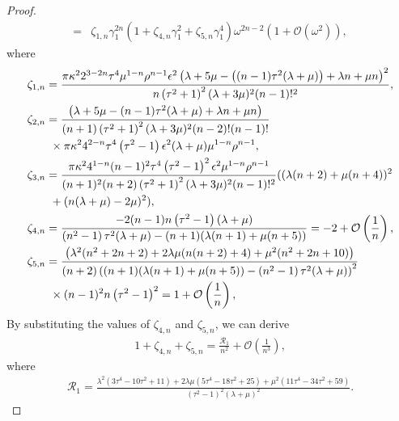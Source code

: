 \documentclass[10pt,a4paper]{amsart}
\begin{document}
\begin{proof}
\begin{align}
		=&\zeta _{1,n}\gamma_1 ^{2n}\left(1+\zeta _{4,n} \gamma_1 ^{2}+\zeta _{5,n} \gamma_1 ^{4}\right)\omega ^{2n-2}\left(1+\mathcal{O}(\omega^{2})\right),\label{eq:unorm}
	\end{align}
	where
	\begin{align}
		&\zeta _{1,n}=\frac{\pi  \kappa^2 2^{3-2 n} \tau ^4 \mu ^{1-n} \rho ^{n-1} \epsilon^{2}\left(\lambda +5 \mu -\left((n-1) \tau ^2 (\lambda +\mu )\right)+\lambda  n+\mu  n\right)^2}{n \left(\tau ^2+1\right)^2 (\lambda +3 \mu )^2  (n-1)!^2},\label{eq:zetau}\\
		&\zeta_{2,n}=\frac{\left(\lambda +5 \mu -(n-1) \tau ^2 (\lambda +\mu )+\lambda  n+\mu  n\right)}{(n+1) \left(\tau ^2+1\right)^2 (\lambda +3 \mu )^2(n-2)!(n-1)!}\notag\\
		&\quad\quad\times \pi  \kappa^2 4^{2-n} \tau ^4 \left(\tau ^2-1\right) \epsilon ^2 (\lambda +\mu ) \mu ^{1-n} \rho ^{n-1},\notag\\
		&\zeta_{3,n}=\frac{\pi  \kappa^2 4^{1-n} (n-1)^2 \tau ^4 \left(\tau ^2-1\right)^2 \epsilon ^2 \mu ^{1-n} \rho ^{n-1} }{(n+1)^2 (n+2) \left(\tau ^2+1\right)^2 (\lambda +3 \mu )^2  (n-1)!^2}((\lambda  (n+2)+\mu  (n+4))^2\notag\\
		&\quad\quad+(n (\lambda +\mu )-2 \mu )^2),\notag\\
		&\zeta _{4,n}=\frac{-2 (n-1) n \left(\tau ^2-1\right) (\lambda +\mu )}{\left(n^2-1\right) \tau ^2 (\lambda +\mu )-(n+1) (\lambda  (n+1)+\mu  (n+5))}=-2+\mathcal{O}\left(\frac{1}{n}\right),\notag\\
		&\zeta _{5,n}=\frac{\left(\lambda ^2 (n^2+2n+2)+2 \lambda  \mu  (n (n+2)+4)+\mu ^2 (n^2+2n+10)\right)}{(n+2) \left((n+1) (\lambda  (n+1)+\mu  (n+5))-\left(n^2-1\right) \tau ^2 (\lambda +\mu )\right)^2}\notag\\
		&\quad\quad\times (n-1)^2 n \left(\tau ^2-1\right)^2=1+\mathcal{O}\left(\frac{1}{n}\right),\notag
	\end{align}
	By substituting the values of \(\zeta _{4,n}\) and \(\zeta _{5,n}\), we can derive	
	\begin{align}\label{eq:zetar}
		1+\zeta _{4,n}+\zeta _{5,n}=\frac{\mathcal{R}_{1}}{n^2}+\mathcal{O}\left(\frac{1}{n^3}\right),
	\end{align}	
	where
	\begin{align}\label{eq:R1}
		\mathcal{R}_{1}=\frac{\lambda ^2 \left(3 \tau ^4-10 \tau ^2+11\right)+2 \lambda  \mu  \left(5 \tau ^4-18 \tau ^2+25\right)+\mu ^2 \left(11 \tau ^4-34 \tau ^2+59\right)}{\left(\tau ^2-1\right)^2 (\lambda +\mu )^2}.
	\end{align}

\end{proof}
\end{document}
